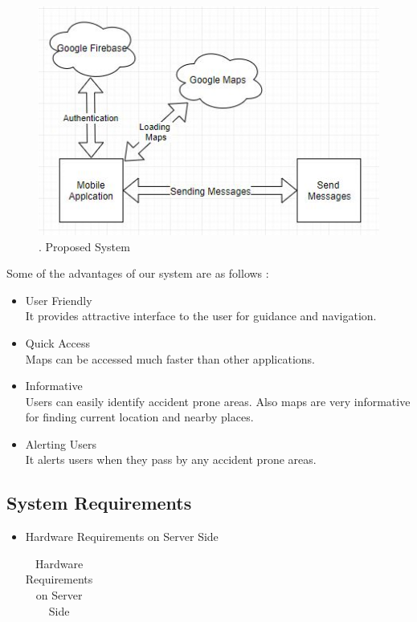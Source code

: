 \documentclass{article}
\begin{document}
\begin{flushleft}
\begin{figure}[!ht]
              \includegraphics[width=12cm]{ProposedSystem.jpg}
              \renewcommand{\thefigure}{ \thesubsection.\arabic{figure}}
              \caption{ .  Proposed System}
            \end{figure}
        Some of the advantages of our system are as follows :
        \begin{itemize}
            \item User Friendly \\
            It provides attractive interface to the user for guidance and navigation.
            \item Quick Access \\
            Maps can be accessed much faster than other applications.
            \item Informative \\
            Users can easily identify accident prone areas. Also maps are very informative for finding current location and nearby places.
            \item Alerting Users \\
            It alerts users when they pass by any accident prone areas.  
        \end{itemize}
        \newpage
        \subsection{System Requirements}
        \begin{itemize}
            \item Hardware Requirements on Server Side
           \begin{center}
           \begin{table}[!ht]
           \renewcommand\thetable{1.5.1}
               \centering
               \caption{Hardware Requirements on Server Side}
               \label{}
              \begin{tabular}{ | m{5em} | m{7cm} | }
           

\end{tabular}
\end{table}
\end{center}
\end{itemize}
\end{flushleft}
\end{document}
